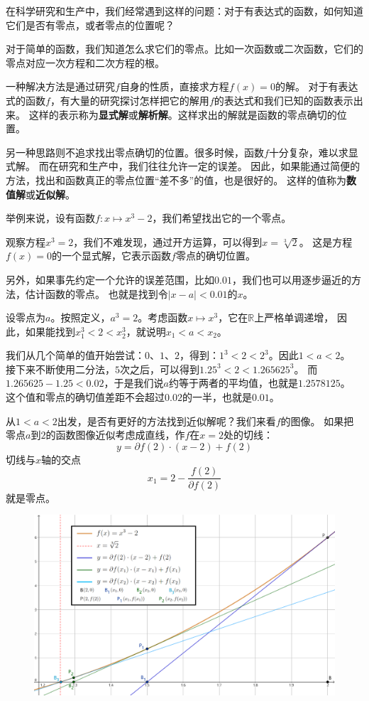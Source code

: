 \documentclass[12pt,UTF8]{ctexbook}
\theoremstyle{definition}
\theoremstyle{plain}
\begin{document}
在科学研究和生产中，我们经常遇到这样的问题：对于有表达式的函数，如何知道它们是否有零点，或者零点的位置呢？

对于简单的函数，我们知道怎么求它们的零点。比如一次函数或二次函数，它们的零点对应一次方程和二次方程的根。

一种解决方法是通过研究$f$自身的性质，直接求方程$f(x) = 0$的解。
对于有表达式的函数$f$，有大量的研究探讨怎样把它的解用$f$的表达式和我们已知的函数表示出来。
这样的表示称为\textbf{显式解}或\textbf{解析解}。这样求出的解就是函数的零点确切的位置。

另一种思路则不追求找出零点确切的位置。很多时候，函数$f$十分复杂，难以求显式解。
而在研究和生产中，我们往往允许一定的误差。
因此，如果能通过简便的方法，找出和函数真正的零点位置“差不多”的值，也是很好的。
这样的值称为\textbf{数值解}或\textbf{近似解}。

举例来说，设有函数$f: x\mapsto x^3 - 2$，我们希望找出它的一个零点。

观察方程$x^3 = 2$，我们不难发现，通过开方运算，可以得到$x = \sqrt[3]{2}$。
这是方程$f(x) = 0$的一个显式解，它表示函数$f$零点的确切位置。

另外，如果事先约定一个允许的误差范围，比如$0.01$，我们也可以用逐步逼近的方法，估计函数的零点。
也就是找到令$|x - a| < 0.01$的$x$。

设零点为$a$。按照定义，$a^3 = 2$。考虑函数$x\mapsto x^3$，它在$\mathbb{R}$上严格单调递增，
因此，如果能找到$x_1^3 < 2 < x_2^3$，就说明$x_1 < a < x_2$。

我们从几个简单的值开始尝试：$0$、$1$、$2$，得到：$1^3 < 2 < 2^3$。因此$1 < a < 2$。
接下来不断使用二分法，$5$次之后，可以得到$1.25^3 < 2 < 1.265625^3$。
而$1.265625 - 1.25 < 0.02$，于是我们说$a$约等于两者的平均值，也就是$1.2578125$。
这个值和零点的确切值差距不会超过$0.02$的一半，也就是$0.01$。

从$1 < a < 2$出发，是否有更好的方法找到近似解呢？我们来看$f$的图像。
如果把零点$a$到$2$的函数图像近似考虑成直线，作$f$在$x=2$处的切线：
$$ y = \partial f(2)\cdot (x - 2) + f(2) $$
切线与$x$轴的交点
$$ x_1 = 2 - \frac{f(2)}{\partial f(2)} $$
就是零点。

\begin{figure}[h]
    \vspace{4pt}
    \centering
    \includegraphics[width=\textwidth]{tu/切线法1.png}
\end{figure}
\end{document}
